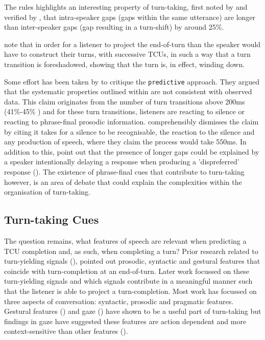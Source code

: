 \documentclass[logo,bsc,singlespacing,parskip]{infthesis}
\begin{document}
The rules highlights an interesting property of turn-taking, first noted by \cite{Sacks1974} and verified by \cite{tenBosch2005}, that intra-speaker gaps (gaps within the same utterance) are longer than inter-speaker gaps (gap resulting in a turn-shift) by around 25\%.

\cite{Sacks1974} note that in order for a listener to project the end-of-turn than the speaker would have to construct their turns, with successive TCUs, in such a way that a turn transition is foreshadowed, showing that the turn is, in effect, winding down.

Some effort has been taken by \cite{HelEdl2010} to critique the \texttt{predictive} approach. They argued that the systematic properties outlined within \cite{Sacks1974} are not consistent with observed data. 
This claim originates from the number of turn transitions above 200ms (41\%-45\% \cite{HelEdl2010}) and for these turn transitions, listeners are reacting to silence or reacting to phrase-final prosodic information. \cite{LevTor2015} comprehensibly dismisses the claim by citing it takes for a silence to be recognisable, the reaction to the silence and any production of speech, where they claim the process would take 550ms. In addition to this, \cite{Riest2015} point out that the presence of longer gaps could be explained by a speaker intentionally delaying a response when producing a 'dispreferred' response (\cite{Lev1983, KenTor2014}). The existence of phrase-final cues that contribute to turn-taking however, is an area of debate that could explain the complexities within the organisation of turn-taking. 

\subsection{Turn-taking Cues}
The question remains, what features of speech are relevant when predicting a TCU completion and, as such, when completing a turn? 
Prior research related to turn-yielding signals (\cite{Duncan1972}), pointed out prosodic, syntactic and gestural features that coincide with turn-completion at an end-of-turn. Later work focussed on these turn-yielding signals and which signals contribute in a meaningful manner such that the listener is able to project a turn-completion. 
Most work has focussed on three aspects of conversation: syntactic, prosodic and pragmatic features. Gestural features (\cite{Duncan1972}) and gaze (\cite{Kendon1967}) have shown to be a useful part of turn-taking but findings in gaze have suggested these features are action dependent and more context-sensitive than other features (\cite{Clayman2013}).
\end{document}
